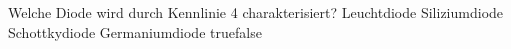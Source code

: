     {Welche Diode wird durch Kennlinie 4 charakterisiert?}
    {Leuchtdiode}
    {Siliziumdiode}
    {Schottkydiode}
    {Germaniumdiode}
    {true}{false}